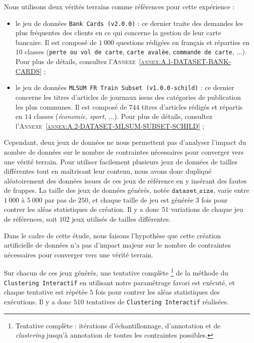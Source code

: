 			Nous utilisons deux vérités terrains comme références pour cette expérience :
			\begin{itemize}
				\item le jeu de données \texttt{Bank Cards (v2.0.0)} :
				ce dernier traite des demandes les plus fréquentes des clients en ce qui concerne la gestion de leur carte bancaire.
				Il est composé de $1~000$ questions rédigées en français et réparties en $10$ classes (\texttt{perte ou vol de carte}, \texttt{carte avalée}, \texttt{commande de carte}, ...).
				Pour plus de détails, consultez l'\textsc{Annexe~\ref{annex:A.1-DATASET-BANK-CARDS}} ;
				\item le jeu de données \texttt{MLSUM FR Train Subset (v1.0.0-schild)} :
				ce dernier concerne les titres d'articles de journaux issus des catégories de publication les plus communes.
				Il est composé de $744$  titres d'articles rédigés et répartis en $14$ classes (\textit{économie}, \textit{sport}, ...).
				Pour plus de détails, consultez l'\textsc{Annexe~\ref{annex:A.2-DATASET-MLSUM-SUBSET-SCHILD}} ;
			\end{itemize}

			Cependant, deux jeux de données ne nous permettent pas d'analyser l'impact du nombre de données sur le nombre de contraintes nécessaires pour converger vers une vérité terrain.
			Pour utiliser facilement plusieurs jeux de données de tailles différentes tout en maîtrisant leur contenu, nous avons donc dupliqué aléatoirement des données issues de ces jeux de référence en y insérant des fautes de frappes.
			La taille des jeux de données générés, notée $\texttt{dataset\_size}$, varie entre $1~000$ à $5~000$ par pas de $250$, et chaque taille de jeu est générée $3$ fois pour contrer les aléas statistiques de création.
			Il y a donc $51$ variations de chaque jeu de références, soit $102$ jeux utilisés de tailles différentes.
			
			\begin{leftBarWarning}
				Dans le cadre de cette étude, nous faisons l'hypothèse que cette création artificielle de données n'a pas d'impact majeur sur le nombre de contraintes nécessaires pour converger vers une vérité terrain.
			\end{leftBarWarning}
			
			Sur chacun de ces jeux générés, une tentative complète \footnote{
				Tentative complète : itérations d'échantillonnage, d'annotation et de \textit{clustering} jusqu'à annotation de toutes les contraintes possibles.
			}
			de la méthode du \texttt{Clustering Interactif} en utilisant notre paramétrage favori est exécuté, et chaque tentative est répétée $5$ fois pour contrer les aléas statistiques des exécutions.
			Il y a donc $510$ tentatives de \texttt{Clustering Interactif} réalisées.
			
